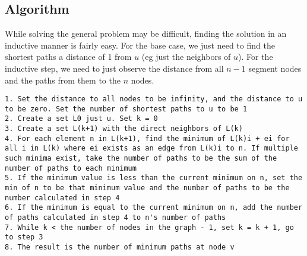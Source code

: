 \documentclass[titlepage]{article}
\begin{document}
\subsection{Algorithm}
While solving the general problem may be difficult, finding the solution in an inductive manner is fairly easy. For the base case, we just
need to find the shortest paths a distance of 1 from $u$ (eg just the neighbors of $u$). For the inductive step, we need to just observe
the distance from all $n-1$ segment nodes and the paths from them to the $n$ nodes.
\begin{lstlisting}
1. Set the distance to all nodes to be infinity, and the distance to u to be zero. Set the number of shortest paths to u to be 1
2. Create a set L0 just u. Set k = 0
3. Create a set L(k+1) with the direct neighbors of L(k)
4. For each element n in L(k+1), find the minimum of L(k)i + ei for all i in L(k) where ei exists as an edge from L(k)i to n. If multiple such minima exist, take the number of paths to be the sum of the number of paths to each minimum
5. If the minimum value is less than the current minimum on n, set the min of n to be that minimum value and the number of paths to be the number calculated in step 4
6. If the minimum is equal to the current minimum on n, add the number of paths calculated in step 4 to n's number of paths
7. While k < the number of nodes in the graph - 1, set k = k + 1, go to step 3
8. The result is the number of minimum paths at node v
\end{lstlisting}
\end{document}
